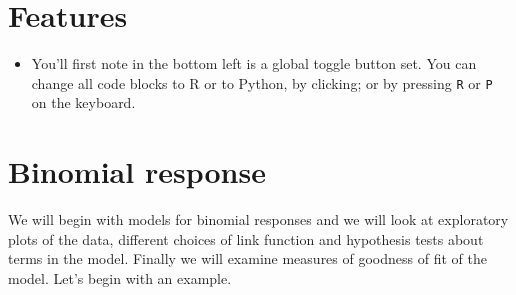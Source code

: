 \documentclass[
  a4paper,
  DIV=11,
  numbers=noendperiod,
  oneside]{scrreport}
\providecommand{\tightlist}{%
  \setlength{\itemsep}{0pt}\setlength{\parskip}{0pt}}
\begin{document}
\section{Features}\label{features}

\begin{itemize}
\tightlist
\item
  You'll first note in the bottom left is a global toggle button set.
  You can change all code blocks to R or to Python, by clicking; or by
  pressing \texttt{R} or \texttt{P} on the keyboard.
\end{itemize}

\section{Binomial response}\label{binomial-response-1}

We will begin with models for binomial responses and we will look at
exploratory plots of the data, different choices of link function and
hypothesis tests about terms in the model. Finally we will examine
measures of goodness of fit of the model. Let's begin with an example.
\end{document}

